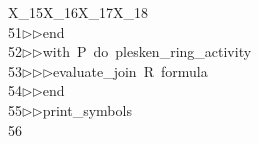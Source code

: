 \begin{tabbing}
\>X\_15X\_16X\_17X\_18\ \\[0pt]
51\>$\triangleright$\>$\triangleright$\>end\ \\[0pt]
52\>$\triangleright$\>$\triangleright$\>with\ P\ do\ plesken\_ring\_activity\ \\[0pt]
53\>$\triangleright$\>$\triangleright$\>$\triangleright$\>evaluate\_join\ R\ formula\ \\[0pt]
54\>$\triangleright$\>$\triangleright$\>end\ \\[0pt]
55\>$\triangleright$\>$\triangleright$\>print\_symbols\\[0pt]
56\>\end{tabbing}

